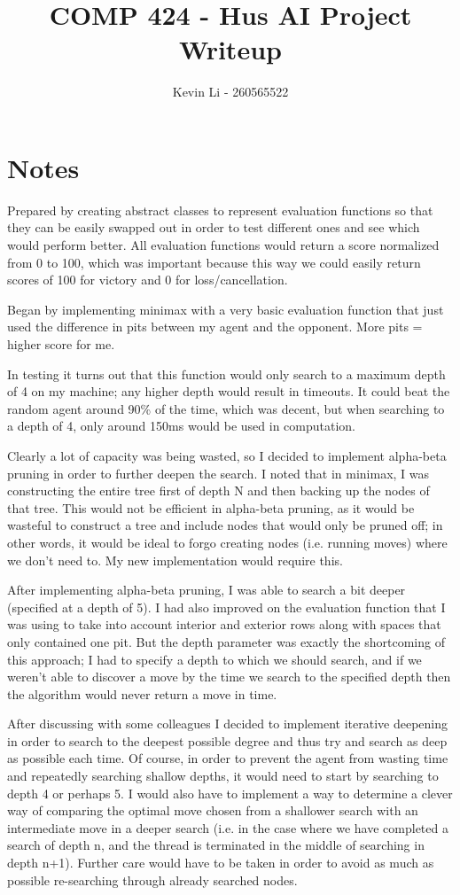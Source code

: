 \documentclass{article}
\title{COMP 424 - Hus AI Project Writeup}
\author{Kevin Li - 260565522}
\begin{document}
\maketitle
\newpage

\section{Notes}

Prepared by creating abstract classes to represent evaluation functions so that they can be easily swapped out
    in order to test different ones and see which would perform better. All evaluation functions would return a score normalized
    from 0 to 100, which was important because this way we could easily return scores of 100 for victory and 0 for loss/cancellation.

Began by implementing minimax with a very basic evaluation function that just used the difference in pits between my agent and
    the opponent. More pits = higher score for me.

In testing it turns out that this function would only search to a maximum depth of 4 on my machine;
    any higher depth would result in timeouts. It could beat the random agent around 90\% of the time, which was decent, but
    when searching to a depth of 4, only around 150ms would be used in computation.

Clearly a lot of capacity was being wasted, so I decided to implement alpha-beta pruning in order to further deepen the search.
    I noted that in minimax, I was constructing the entire tree first of depth N and then backing up the nodes of that tree. This would not
    be efficient in alpha-beta pruning, as it would be wasteful to construct a tree and include nodes that would only be pruned off;
    in other words, it would be ideal to forgo creating nodes (i.e. running moves) where we don't need to. My new implementation would
    require this.

After implementing alpha-beta pruning, I was able to search a bit deeper (specified at a depth of 5). I had also improved on the evaluation function
that I was using to take into account interior and exterior rows along with spaces that only contained one pit. But the depth parameter was exactly the shortcoming
of this approach; I had to specify a depth to which we should search, and if we weren't able to discover a move by the time we search to the specified depth then
the algorithm would never return a move in time.

After discussing with some colleagues I decided to implement iterative deepening in order to search to the deepest
possible degree and thus try and search as deep as possible each time. Of course, in order to prevent the agent from wasting time and repeatedly searching shallow depths,
it would need to start by searching to depth 4 or perhaps 5. I would also have to implement a way to determine a clever way of comparing the optimal move chosen from
a shallower search with an intermediate move in a deeper search (i.e. in the case where we have completed a search of depth n, and the thread is terminated in the middle
of searching in depth n+1). Further care would have to be taken in order to avoid as much as possible re-searching through already searched nodes.
\end{document}
